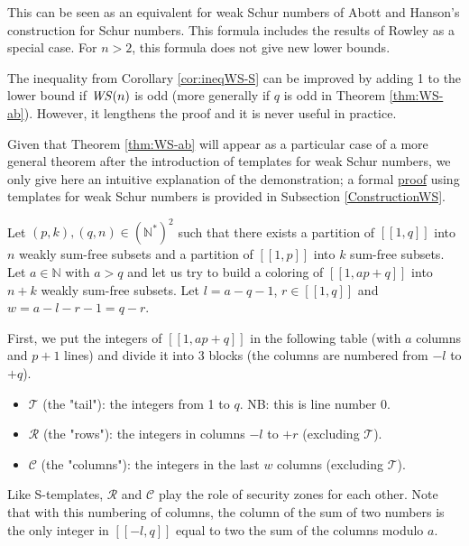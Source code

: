 This can be seen as an equivalent for weak Schur numbers of Abott and Hanson's construction for Schur numbers. This formula includes
the results of Rowley \cite{RowleyWS} as a special case. For \(n>2\), this formula does not give new lower bounds.

\begin{remark}
The inequality from Corollary \ref{cor:ineqWS-S} can be improved by adding 1 to the lower bound if \(\mathit{WS} (n)\) is odd (more generally if \(q\) is
odd in Theorem \ref{thm:WS-ab}). However, it lengthens the proof and it is never useful in practice.
\end{remark}

Given that Theorem \ref{thm:WS-ab} will appear as a particular case of a more general theorem after the introduction of
templates for weak Schur numbers, we only give here an intuitive explanation of the demonstration; a formal
\hyperref[PreuveThm]{proof} using templates for weak Schur numbers is provided in Subsection \ref{ConstructionWS}.

Let \((p, k), (q, n) \in (\mathbb{N}^*)^2\) such that there exists a partition of \([\![1,q]\!]\) into \(n\) weakly sum-free
subsets and a partition of \([\![1,p]\!]\) into \(k\) sum-free subsets. Let \(a \in \mathbb{N}\) with \(a > q\)
and let us try to build a coloring of \([\![1, ap + q]\!]\) into \(n + k\) weakly sum-free subsets. Let
\(l = a - q - 1\), \(r \in [\![1,q]\!]\) and \(w = a - l - r - 1 = q - r\).

First, we put the integers of \([\![1, ap + q]\!]\) in the following table (with \(a\) columns and \(p + 1\) lines)
and divide it into 3 blocks (the columns are numbered from \(-l\) to \(+q\)).

\begin{itemize}
	\item \(\mathcal{T}\) (the "tail"): the integers from 1 to \(q\). NB: this is line number 0.
	\item \(\mathcal{R}\) (the "rows"): the integers in columns \(-l\) to \(+r\) (excluding  \(\mathcal{T}\)).
	\item \(\mathcal{C}\) (the "columns"): the integers in the last \(w\) columns (excluding  \(\mathcal{T}\)).
\end{itemize}

Like S-templates, \(\mathcal{R}\) and \(\mathcal{C}\) play the role of security zones for each other. Note that with
this numbering of columns, the column of the sum of two numbers is the only integer in \([\![-l,q]\!]\) equal to two the
sum of the columns modulo \(a\).

